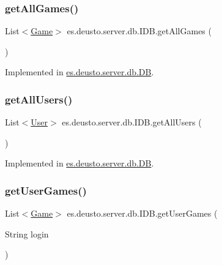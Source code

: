 \subsubsection{\texorpdfstring{get\+All\+Games()}{getAllGames()}}
{\footnotesize\ttfamily List$<$\hyperlink{classes_1_1deusto_1_1server_1_1db_1_1data_1_1_game}{Game}$>$ es.\+deusto.\+server.\+db.\+I\+D\+B.\+get\+All\+Games (\begin{DoxyParamCaption}{ }\end{DoxyParamCaption})}



Implemented in \hyperlink{classes_1_1deusto_1_1server_1_1db_1_1_d_b_ad878c1c58062596b5e1b582ed496bd11}{es.\+deusto.\+server.\+db.\+DB}.

\mbox{\label{interfacees_1_1deusto_1_1server_1_1db_1_1_i_d_b_ab2893cf6b112e1789b5a9e62f5156f6a}} 
\subsubsection{\texorpdfstring{get\+All\+Users()}{getAllUsers()}}
{\footnotesize\ttfamily List$<$\hyperlink{classes_1_1deusto_1_1server_1_1db_1_1data_1_1_user}{User}$>$ es.\+deusto.\+server.\+db.\+I\+D\+B.\+get\+All\+Users (\begin{DoxyParamCaption}{ }\end{DoxyParamCaption})}



Implemented in \hyperlink{classes_1_1deusto_1_1server_1_1db_1_1_d_b_a245d98f8d670e29804a28d60daa7835b}{es.\+deusto.\+server.\+db.\+DB}.

\mbox{\label{interfacees_1_1deusto_1_1server_1_1db_1_1_i_d_b_ac5ef9780a640140576f9373f8b57631c}} 
\subsubsection{\texorpdfstring{get\+User\+Games()}{getUserGames()}}
{\footnotesize\ttfamily List$<$\hyperlink{classes_1_1deusto_1_1server_1_1db_1_1data_1_1_game}{Game}$>$ es.\+deusto.\+server.\+db.\+I\+D\+B.\+get\+User\+Games (\begin{DoxyParamCaption}\item[{String}]{login }\end{DoxyParamCaption})}




